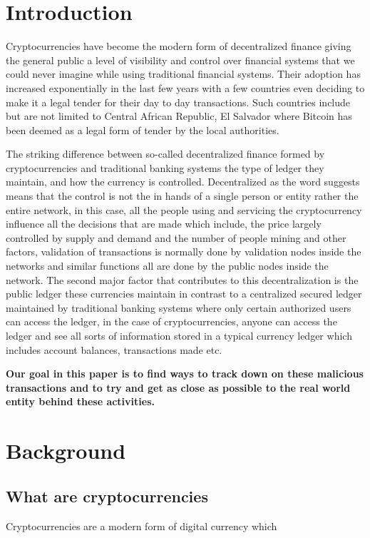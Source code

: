 \documentclass{article}
\begin{document}
\section{Introduction}
Cryptocurrencies have become the modern form of decentralized finance giving the general public a level of visibility and control over financial systems that we could never imagine while using traditional financial systems. Their adoption has increased exponentially in the last few years with a few countries even deciding to make it a legal tender for their day to day transactions. Such countries include but are not limited to Central African Republic, El Salvador \cite{browne_2022} where Bitcoin has been deemed as a legal form of tender by the local authorities. 

The striking difference between so-called decentralized finance\cite{zetzsche_arner_buckley_2020} formed by cryptocurrencies and traditional banking systems the type of ledger they maintain, and how the currency is controlled. Decentralized as the word suggests means that the control is not the in hands of a single person or entity rather the entire network, in this case, all the people using and servicing the cryptocurrency influence all the decisions that are made which include, the price largely controlled by supply and demand and the number of people mining and other factors, validation of transactions is normally done by validation nodes inside the networks and similar functions all are done by the public nodes inside the network. The second major factor that contributes to this decentralization is the public ledger these currencies maintain in contrast to a centralized secured ledger maintained by traditional banking systems where only certain authorized users can access the ledger, in the case of cryptocurrencies, anyone can access the ledger and see all sorts of information stored in a typical currency ledger which includes account balances, transactions made etc. 

\textbf{Our goal in this paper is to find ways to track down on these malicious transactions and to try and get as close as possible to the real world entity behind these activities.}

\pagebreak
\section{Background}

\subsection{What are cryptocurrencies}
Cryptocurrencies are a modern form of digital currency which 
\end{document}
